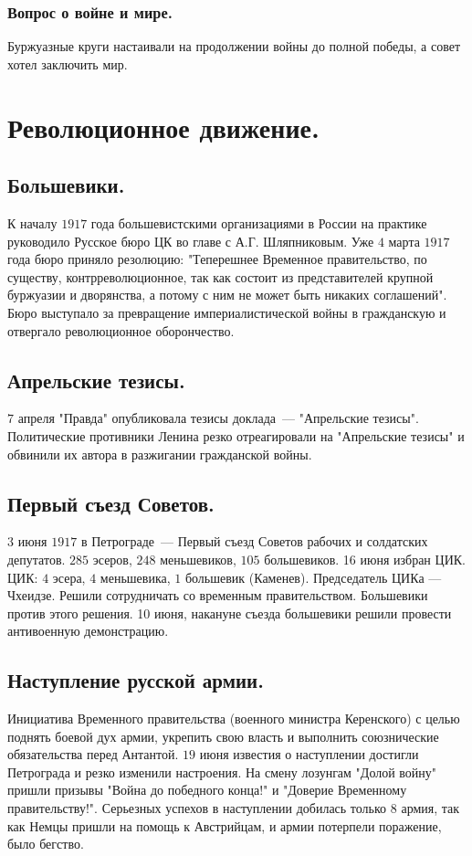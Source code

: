 \documentclass[12pt]{article}
\begin{document}
	\subsubsection{Вопрос о войне и мире.}
	Буржуазные круги настаивали на продолжении войны до полной победы, а совет хотел заключить мир.
	\section{Революционное движение.}
	\subsection{Большевики.}
	К началу $1917$ года большевистскими организациями в России на практике руководило Русское бюро ЦК во главе с А.Г. Шляпниковым. Уже $4$ марта $1917$ года бюро приняло резолюцию: "Теперешнее Временное правительство, по существу, контрреволюционное, так как состоит из представителей крупной буржуазии и дворянства, а потому с ним не может быть никаких соглашений". Бюро выступало за превращение империалистической войны в гражданскую и отвергало революционное оборончество.
	\subsection{Апрельские тезисы.}
	$7$ апреля "Правда" опубликовала тезисы доклада~--- "Апрельские тезисы". Политические противники Ленина резко отреагировали на "Апрельские тезисы" и обвинили их автора в разжигании гражданской войны.
	\subsection{Первый съезд Советов.}
	$3$ июня $1917$ в Петрограде~--- Первый съезд Советов рабочих и солдатских депутатов. $285$ эсеров, $248$ меньшевиков, $105$ большевиков. 16 июня избран ЦИК. ЦИК: $4$ эсера, $4$ меньшевика, $1$ большевик (Каменев). Председатель ЦИКа --- Чхеидзе. Решили сотрудничать со временным правительством. Большевики против этого решения. 10 июня, накануне съезда большевики решили провести антивоенную демонстрацию.
	\subsection{Наступление русской армии.}
	Инициатива Временного правительства (военного министра Керенского) с целью поднять боевой дух армии, укрепить свою власть и выполнить союзнические обязательства перед Антантой. $19$ июня известия о наступлении достигли Петрограда и резко изменили настроения. На смену лозунгам "Долой войну" пришли призывы "Война до победного конца!" и "Доверие Временному правительству!".
	Серьезных успехов в наступлении добилась только $8$ армия, так как Немцы пришли на помощь к Австрийцам, и армии потерпели поражение, было бегство.
\end{document}
